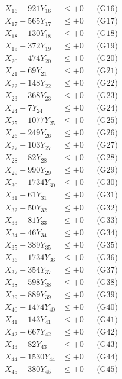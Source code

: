 \documentclass[a4paper,10pt]{article}
\begin{document}
{\begin{align}
X_{16} - 921Y_{16} &\leq +0 && \text{(G16)} \\
X_{17} - 565Y_{17} &\leq +0 && \text{(G17)} \\
X_{18} - 130Y_{18} &\leq +0 && \text{(G18)} \\
X_{19} - 372Y_{19} &\leq +0 && \text{(G19)} \\
X_{20} - 474Y_{20} &\leq +0 && \text{(G20)} \\
\allowbreak
X_{21} - 69Y_{21} &\leq +0 && \text{(G21)} \\
X_{22} - 148Y_{22} &\leq +0 && \text{(G22)} \\
X_{23} - 368Y_{23} &\leq +0 && \text{(G23)} \\
X_{24} - 7Y_{24} &\leq +0 && \text{(G24)} \\
X_{25} - 1077Y_{25} &\leq +0 && \text{(G25)} \\
X_{26} - 249Y_{26} &\leq +0 && \text{(G26)} \\
X_{27} - 103Y_{27} &\leq +0 && \text{(G27)} \\
X_{28} - 82Y_{28} &\leq +0 && \text{(G28)} \\
X_{29} - 990Y_{29} &\leq +0 && \text{(G29)} \\
X_{30} - 1734Y_{30} &\leq +0 && \text{(G30)} \\
\allowbreak
X_{31} - 61Y_{31} &\leq +0 && \text{(G31)} \\
X_{32} - 50Y_{32} &\leq +0 && \text{(G32)} \\
X_{33} - 81Y_{33} &\leq +0 && \text{(G33)} \\
X_{34} - 46Y_{34} &\leq +0 && \text{(G34)} \\
X_{35} - 389Y_{35} &\leq +0 && \text{(G35)} \\
X_{36} - 1734Y_{36} &\leq +0 && \text{(G36)} \\
X_{37} - 354Y_{37} &\leq +0 && \text{(G37)} \\
X_{38} - 598Y_{38} &\leq +0 && \text{(G38)} \\
X_{39} - 889Y_{39} &\leq +0 && \text{(G39)} \\
X_{40} - 1474Y_{40} &\leq +0 && \text{(G40)} \\
\allowbreak
X_{41} - 143Y_{41} &\leq +0 && \text{(G41)} \\
X_{42} - 667Y_{42} &\leq +0 && \text{(G42)} \\
X_{43} - 82Y_{43} &\leq +0 && \text{(G43)} \\
X_{44} - 1530Y_{44} &\leq +0 && \text{(G44)} \\
X_{45} - 380Y_{45} &\leq +0 && \text{(G45)} \\

\end{align}}
\end{document}
